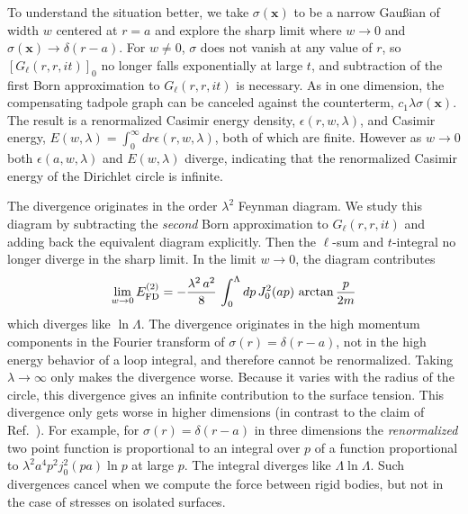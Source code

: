 \documentclass[a4paper,aps,amsfonts,prl,showpacs,nobibnotes,nofootinbib,%
tightenlines,twocolumn]{revtex4}
\newcommand{\vek}[1]{\mathbf{#1}}
\begin{document}
To understand the situation better, we take $\sigma(\vek x)$ to be a
narrow Gau{\ss}ian of width $w$ centered at $r=a$ and explore the
sharp limit where $w\to 0$ and $\sigma(\vek
x)\to\delta(r-a)$.  For $w\ne 0$, $\sigma$ does not vanish at any
value of $r$, so $[G_{\ell}(r,r,it)]_0$ no longer falls exponentially
at large $t$, and subtraction of the first Born approximation to
$G_{\ell}(r,r,it)$ is necessary.  As in one dimension, the
compensating tadpole graph can be canceled against the counterterm,
$c_{1}\lambda\sigma(\vek x)$.  The result is a renormalized Casimir
energy density, $\epsilon(r,w,\lambda)$, and Casimir energy,
$E(w,\lambda)=\int_{0}^{\infty}dr \epsilon(r,w,\lambda)$, both of
which are finite.  However as $w\to 0$ both $\epsilon(a,w,\lambda)$
and $E(w,\lambda)$ diverge, indicating that the renormalized Casimir
energy of the Dirichlet circle is infinite.

The divergence originates in the order $\lambda^2$
Feynman diagram.  We study this diagram by subtracting the
\emph{second} Born approximation to $G_{\ell}(r,r,it)$ and adding back
the equivalent diagram explicitly.  Then the  $\ell$-sum and
$t$-integral no longer diverge in the  sharp limit.  In
the limit $w\to 0$, the diagram contributes
\begin{equation}
\lim_{w\to 0}E_{\rm FD}^{(2)} = - \frac{\lambda^2\,a^2}{8}\,
\int_0^\Lambda dp\,J_0^2(a p)\,\arctan\frac{p}{2m}  
\label{B6}
\end{equation}
%
which diverges like $\ln\Lambda$.  The divergence originates in the
high momentum components in the Fourier transform of
$\sigma(r)=\delta(r-a)$, not in the high energy behavior of a
loop integral, and therefore cannot be renormalized.  Taking
$\lambda\to\infty$ only makes the divergence worse.  Because it varies
with the radius of the circle, this divergence gives an infinite
contribution to the surface tension.  This divergence only gets
worse in higher dimensions (in contrast to the claim of
Ref.~\cite{Milton}).  For example, for $\sigma(r)=\delta(r-a)$ in
three dimensions the \emph{renormalized} two point function is
proportional to an integral over $p$ of a function proportional to
$\lambda^{2}a^{4} p^{2} j_{0}^{2}(pa)\ln p$ at large $p$.  The
integral diverges like $\Lambda\ln\Lambda$. Such divergences cancel
when we compute the force between rigid bodies, but not in the case of
stresses on isolated surfaces.
\end{document}

